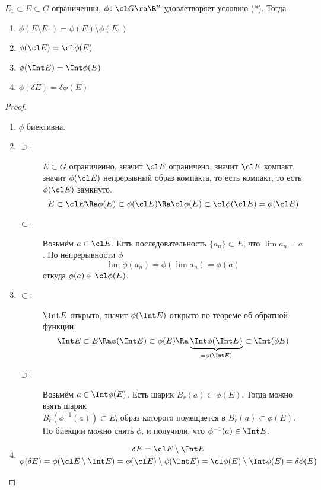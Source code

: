 \begin{lemma}
	$E_1 \subset E \subset G$ ограниченны, $\phi\colon \cl G \ra \R^n$ удовлетворяет условию (*).
	Тогда
	\begin{enumerate}
		\item $\phi(E \setminus E_1) = \phi(E) \setminus \phi(E_1)$
		\item $\phi(\cl E) = \cl \phi(E)$
		\item $\phi(\Int E) = \Int \phi(E)$
		\item $\phi(\delta E) = \delta \phi(E)$
	\end{enumerate}
\end{lemma}
\begin{proof}\begin{enumerate}
\item
	$\phi$ биективна.

\item
	\begin{description}
	\item[$\supset$:]
		$E \subset G$ ограниченно, значит $\cl E$ ограничено, значит $\cl E$ компакт,
		значит $\phi(\cl E)$ непрерывный образ компакта, то есть компакт, то есть $\phi(\cl E)$ замкнуто.
		\[
			E \subset \cl E \Ra \phi(E) \subset \phi(\cl E) \Ra \cl \phi(E) \subset \cl \phi(\cl E) = \phi(\cl E)
		\]

	\item[$\subset$:]
		Возьмём $a \in \cl E$. Есть последовательность $\{a_n\} \subset E$, что $\lim a_n = a$.
		По непрерывности $\phi$
		\[
			\lim \phi(a_n) = \phi(\lim a_n) = \phi(a)
		\]
		откуда $\phi(a) \in \cl \phi(E)$.
	\end{description}

\item
	\begin{description}
	\item[$\subset$:]
		$\Int E$ открыто, значит $\phi(\Int E)$ открыто по теореме об обратной функции.
		\[
			\Int E \subset E \Ra \phi(\Int E) \subset \phi(E) \Ra \underbrace{\Int \phi(\Int E)}_{= \phi(\Int E)} \subset \Int(\phi E)
		\]

	\item[$\supset$:]
		Возьмём $a \in \Int \phi(E)$.
		Есть шарик $B_r(a) \subset \phi(E)$.
		Тогда можно взять шарик\\$B_\epsilon(\phi^{-1}(a)) \subset E$, образ которого помещается в $B_r(a) \subset \phi(E)$.
		По биекции можно снять $\phi$, и получили, что $\phi^{-1}(a) \in \Int E$.
	\end{description}

\item
	\begin{gather*}
		\delta E = \cl E \setminus \Int E \\
		\phi(\delta E) = \phi(\cl E \setminus \Int E) = \phi(\cl E) \setminus \phi (\Int E)
		= \cl \phi(E) \setminus \Int \phi(E) = \delta \phi(E)
	\end{gather*}
\end{enumerate}\end{proof}

